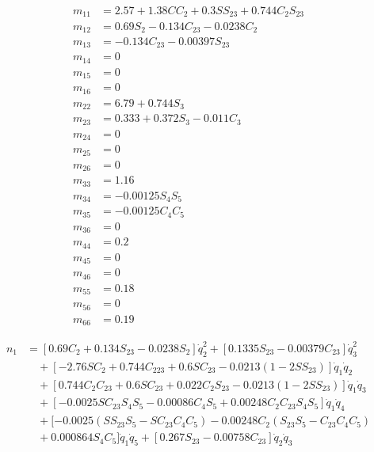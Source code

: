 \documentclass[UTF8]{ctexart}
\begin{document}
\begin{align*}
m_{11} &= 2.57 + 1.38CC_2 + 0.3SS_{23} + 0.744C_2S_{23} \\
m_{12} &= 0.69S_2 - 0.134C_{23} - 0.0238C_2 \\
m_{13} &= -0.134C_{23} - 0.00397S_{23} \\
m_{14} &= 0 \\
m_{15} &= 0 \\
m_{16} &= 0 \\
m_{22} &= 6.79 + 0.744S_3 \\
m_{23} &= 0.333 + 0.372S_3 - 0.011C_3 \\
m_{24} &= 0 \\
m_{25} &= 0 \\
m_{26} &= 0 \\
m_{33} &= 1.16 \\
m_{34} &= -0.00125S_4S_5 \\
m_{35} &= -0.00125C_4C_5 \\
m_{36} &= 0 \\
m_{44} &= 0.2 \\
m_{45} &= 0 \\
m_{46} &= 0 \\
m_{55} &= 0.18 \\
m_{56} &= 0 \\
m_{66} &= 0.19
\end{align*}

\begin{align*}
n_1 &= [0.69C_2 + 0.134S_{23} - 0.0238S_2]\dot{q}_2^2 + [0.1335S_{23} - 0.00379C_{23}]\dot{q}_3^2 \\
&\quad + [-2.76SC_2 + 0.744C_{223} + 0.6SC_{23} - 0.0213(1 - 2SS_{23})]\dot{q}_1\dot{q}_2 \\
&\quad + [0.744C_2C_{23} + 0.6SC_{23} + 0.022C_2S_{23} - 0.0213(1 - 2SS_{23})]\dot{q}_1\dot{q}_3 \\
&\quad + [-0.0025SC_{23}S_4S_5 - 0.00086C_4S_5 + 0.00248C_2C_{23}S_4S_5]\dot{q}_1\dot{q}_4 \\
&\quad + [-0.0025(SS_{23}S_5 - SC_{23}C_4C_5) - 0.00248C_2(S_{23}S_5 - C_{23}C_4C_5) \\
&\quad + 0.000864S_4C_5]\dot{q}_1\dot{q}_5 + [0.267S_{23} - 0.00758C_{23}]\dot{q}_2\dot{q}_3
\end{align*}
\end{document}
